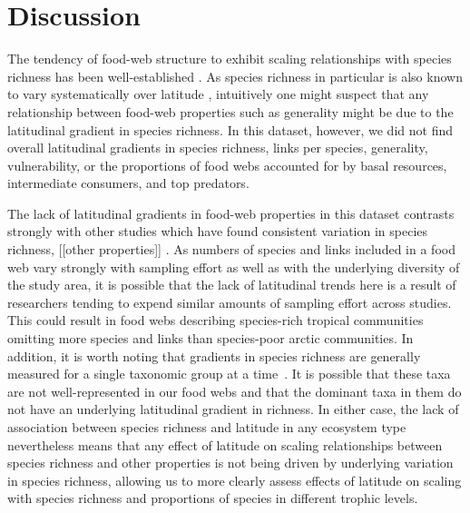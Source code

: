 \documentclass[12pt]{article}
\begin{document}
\section*{Discussion}

The tendency of food-web structure to exhibit scaling relationships with
species richness has been well-established \citep{Dunne2004,Riede2010}. As
species richness in particular is also known to vary systematically over
latitude \citep{}, intuitively one might suspect that any relationship
between food-web properties such as generality might be due to the latitudinal
gradient in species richness. In this dataset, however, we did not find
overall latitudinal gradients in species richness, links per species, 
generality, vulnerability, or the proportions of food webs accounted for by 
basal resources, intermediate consumers, and top predators. 


The lack of latitudinal gradients in food-web properties in this dataset contrasts
strongly with other studies which have found consistent variation in species richness,
[[other properties]] \citep{}. As numbers of species and links included in a food web
vary strongly with sampling effort as well as with the underlying diversity of the study
area, it is possible that the lack of latitudinal trends here is a result of researchers
tending to expend similar amounts of sampling effort across studies. This could result in
food webs describing species-rich tropical communities omitting more species and links
than species-poor arctic communities. In addition, it is worth noting that gradients in
species richness are generally measured for a single taxonomic group at a time~\citep{}.
It is possible that these taxa are not well-represented in our food webs and that the
dominant taxa in them do not have an underlying latitudinal gradient in richness. In
either case, the lack of association between species richness
and latitude in any ecosystem type nevertheless means that any effect of latitude on scaling relationships
between species richness and other properties is not being driven by underlying variation in
species richness, allowing us to more clearly assess effects of latitude on scaling with 
species richness and proportions of species in different trophic levels.
\end{document}
